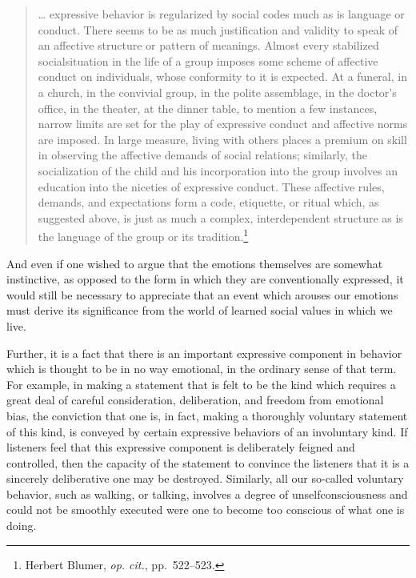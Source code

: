 \documentclass[twoside,symmetric,nobib,justified]{tufte-book}
\begin{document}
\begin{quote}
\ldots{} expressive behavior is regularized by social codes much as is
language or conduct. There seems to be as much justification and
validity to speak of an affective structure or pattern of meanings.
Almost every stabilized social\newpage\noindent situation in the life of a group imposes
some scheme of affective conduct on individuals, whose conformity to it
is expected. At a funeral, in a church, in the convivial group, in the
polite assemblage, in the doctor's office, in the theater, at the dinner
table, to mention a few instances, narrow limits are set for the play of
expressive conduct and affective norms are imposed. In large measure,
living with others places a premium on skill in observing the affective
demands of social relations; similarly, the socialization of the child
and his incorporation into the group involves an education into the
niceties of expressive conduct. These affective rules, demands, and
expectations form a code, etiquette, or ritual which, as suggested
above, is just as much a complex, interdependent structure as is the
language of the group or its tradition.\footnote{Herbert Blumer,
  \emph{op. cit.}, pp.~522--523.}
\end{quote}

\noindent And even if one wished to argue that the emotions themselves are
somewhat instinctive, as opposed to the form in which they are
conventionally expressed, it would still be necessary to appreciate that
an event which arouses our emotions must derive its significance from
the world of learned social values in which we live.

Further, it is a fact that there is an important expressive component in
behavior which is thought to be in no way emotional, in the ordinary
sense of that term. For example, in making a statement that is felt to
be the kind which requires a great deal of careful consideration,
deliberation, and freedom from emotional bias, the conviction that one
is, in fact, making a thoroughly voluntary statement of this kind, is
conveyed by certain expressive behaviors of an involuntary kind. If
listeners feel that this expressive component is deliberately feigned
and controlled, then the capacity of the statement to convince the
listeners that it is a sincerely deliberative one may be destroyed.
Similarly, all our so-called voluntary behavior, such as walking, or
talking, involves a degree of unselfconsciousness and could not be
smoothly executed were one to become too conscious of what one is doing.
\end{document}
